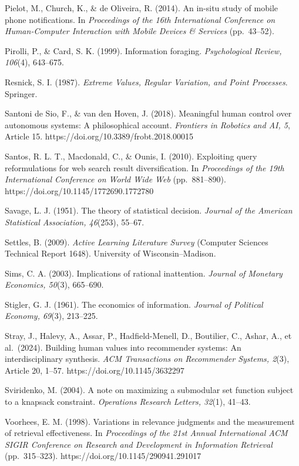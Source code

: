 \documentclass[
  11pt]{article}
\begin{document}
Pielot, M., Church, K., \& de Oliveira, R. (2014). An in-situ study of
mobile phone notifications. In \emph{Proceedings of the 16th
International Conference on Human-Computer Interaction with Mobile
Devices \& Services} (pp.~43--52).

Pirolli, P., \& Card, S. K. (1999). Information foraging.
\emph{Psychological Review, 106}(4), 643--675.

Resnick, S. I. (1987). \emph{Extreme Values, Regular Variation, and
Point Processes}. Springer.

Santoni de Sio, F., \& van den Hoven, J. (2018). Meaningful human
control over autonomous systems: A philosophical account.
\emph{Frontiers in Robotics and AI, 5}, Article 15.
https://doi.org/10.3389/frobt.2018.00015

Santos, R. L. T., Macdonald, C., \& Ounis, I. (2010). Exploiting query
reformulations for web search result diversification. In
\emph{Proceedings of the 19th International Conference on World Wide
Web} (pp.~881--890). https://doi.org/10.1145/1772690.1772780

Savage, L. J. (1951). The theory of statistical decision. \emph{Journal
of the American Statistical Association, 46}(253), 55--67.

Settles, B. (2009). \emph{Active Learning Literature Survey} (Computer
Sciences Technical Report 1648). University of Wisconsin--Madison.

Sims, C. A. (2003). Implications of rational inattention. \emph{Journal
of Monetary Economics, 50}(3), 665--690.

Stigler, G. J. (1961). The economics of information. \emph{Journal of
Political Economy, 69}(3), 213--225.

Stray, J., Halevy, A., Assar, P., Hadfield-Menell, D., Boutilier, C.,
Ashar, A., et al.~(2024). Building human values into recommender
systems: An interdisciplinary synthesis. \emph{ACM Transactions on
Recommender Systems, 2}(3), Article 20, 1--57.
https://doi.org/10.1145/3632297

Sviridenko, M. (2004). A note on maximizing a submodular set function
subject to a knapsack constraint. \emph{Operations Research Letters,
32}(1), 41--43.

Voorhees, E. M. (1998). Variations in relevance judgments and the
measurement of retrieval effectiveness. In \emph{Proceedings of the 21st
Annual International ACM SIGIR Conference on Research and Development in
Information Retrieval} (pp.~315--323).
https://doi.org/10.1145/290941.291017
\end{document}
